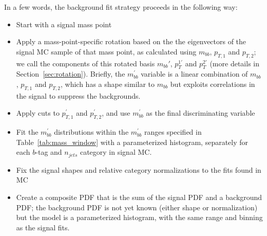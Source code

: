 In a few words, the background fit strategy proceeds in the following way:
\begin{itemize}
    \item Start with a signal mass point
    \item Apply a mass-point-specific rotation based on the the eigenvectors of 
    the signal MC sample of that mass point, as calculated using $m_{bb}$, $p_{T,1}$ and $p_{T,2}$; we call 
    the components of this rotated basis $m_{bb}'$, $p_T^{1'}$ and $p_T^{2'}$ (more
    details in Section~\ref{sec:rotation}).  Briefly, the $m^{'}_{bb}$ variable
    is a linear combination of $m_{bb}$, $p_{T,1}$ and $p_{T,2}$, which has a shape
    similar to $m_{bb}$ but exploits correlations in the signal to suppress the backgrounds.
    \item Apply cuts to $p^{'}_{T,1}$ and $p^{'}_{T,2}$, and use $m_{bb}^{'}$ as the final 
    discriminating variable 
    \item Fit the $m_{bb}^{'}$ distributions within the $m^{'}_{bb}$ ranges specified in Table~\ref{tab:mass_window} 
    with a parameterized histogram, separately for each $b$-tag and $n_{jets}$ category
    in signal MC.
    \item Fix the signal shapes and relative category normalizations to the fits found in MC
    \item Create a composite PDF that is the sum of the signal PDF and a background PDF; 
    the background PDF is not yet known (either shape or normalization) but the model is a
    parameterized histogram, with the same range and binning as the signal fits.  


\end{itemize}
